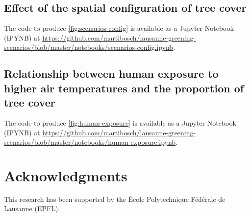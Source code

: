 \documentclass[10pt,letterpaper]{article}
\begin{document}
\subsection*{Effect of the spatial configuration of tree cover}
\label{sec:effect-config}

The code to produce \autoref{fig:scenarios-config} is available as a Jupyter Notebook (IPYNB) at \url{https://github.com/martibosch/lausanne-greening-scenarios/blob/master/notebooks/scenarios-config.ipynb}.


\subsection*{Relationship between human exposure to higher air temperatures and the proportion of tree cover}
\label{sec:human-exposure}


The code to produce \autoref{fig:human-exposure} is available as a Jupyter Notebook (IPYNB) at \url{https://github.com/martibosch/lausanne-greening-scenarios/blob/master/notebooks/human-exposure.ipynb}.

\section*{Acknowledgments}
This research has been supported by the \'Ecole Polytechnique F\'ed\'erale de Lausanne (EPFL).

\nolinenumbers




\end{document}
